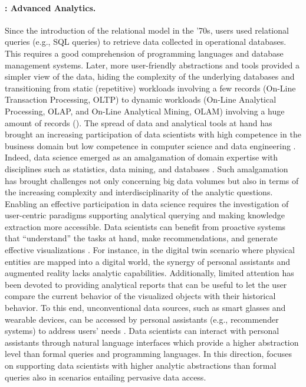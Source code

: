 \paragraph{: Advanced Analytics.}
Since the introduction of the relational model in the '70s, users used relational queries (e.g., SQL queries) to retrieve data collected in operational databases. This requires a good comprehension of programming languages and database management systems. Later, more user-friendly abstractions and tools provided a simpler view of the data, hiding the complexity of the underlying databases \cite{DBLP:journals/is/VassiliadisMR19} and transitioning from static (repetitive) workloads involving a few records (On-Line Transaction Processing, OLTP) to dynamic workloads (On-Line Analytical Processing, OLAP, and On-Line Analytical Mining, OLAM) involving a huge amount of records (). The spread of data and analytical tools at hand has brought an increasing participation of data scientists with high competence in the business domain but low competence in computer science and data engineering \cite{DBLP:journals/is/VassiliadisMR19}. Indeed, data science emerged as an amalgamation of domain expertise with disciplines such as statistics, data mining, and databases \cite{vanderAalst2016}. Such amalgamation has brought challenges not only concerning big data volumes but also in terms of the increasing complexity and interdisciplinarity of the analytic questions. Enabling an effective participation in data science requires the investigation of user-centric paradigms supporting analytical querying and making knowledge extraction more accessible. Data scientists can benefit from proactive systems that ``understand'' the tasks at hand, make recommendations, and generate effective visualizations \cite{DBLP:journals/cacm/GilPBBBBCEGHHHK19}. For instance, in the digital twin scenario \cite{tao2018digital} where physical entities are mapped into a digital world, the synergy of personal assistants and augmented reality lacks analytic capabilities. Additionally, limited attention has been devoted to providing analytical reports that can be useful to let the user compare the current behavior of the visualized objects with their historical behavior. To this end, unconventional data sources, such as smart glasses and wearable devices, can be accessed by personal assistants (e.g., recommender systems) to address users' needs \cite{DBLP:conf/ictir/BahrainianC17}. Data scientists can interact with personal assistants through natural language interfaces which provide a higher abstraction level than formal queries and programming languages. In this direction,  focuses on supporting data scientists with higher analytic abstractions than formal queries also in scenarios entailing pervasive data access. 